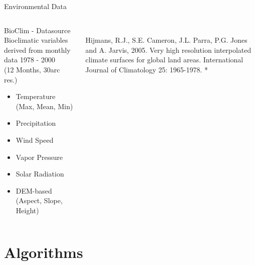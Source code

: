\documentclass{beamer}
\begin{document}
\begin{frame}{Environmental Data}
\begin{columns}
	\begin{column}{0.4\textwidth}
\begin{block}{BioClim - Datasource}
Bioclimatic variables derived from monthly data 1978 -  2000 \\(12 Months, 30arc res.)
\begin{itemize}
	\item Temperature (Max, Mean, Min)
	\item Precipitation
	\item Wind Speed
	\item Vapor Pressure
	\item Solar Radiation
	\item DEM-based (Aspect, Slope, Height)
\end{itemize}
	\end{block}		
	\end{column}
	\begin{column}{0.6\textwidth}
			\centering
			\centering
{}
{\tiny \\ Hijmans, R.J., S.E. Cameron, J.L. Parra, P.G. Jones and A. Jarvis, 2005. Very high resolution interpolated climate surfaces for global land areas. International Journal of Climatology 25: 1965-1978. * }
\end{column}    	    
		\end{columns}	
\end{frame}

\section{Algorithms}
\end{document}
